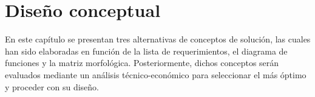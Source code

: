 \chapter{Diseño conceptual}
\label{ch:CH03}
\noindent
En este capítulo se presentan tres alternativas de conceptos de solución, las cuales han sido elaboradas en función de la lista de requerimientos, el diagrama de funciones y la matriz morfológica. Posteriormente, dichos conceptos serán evaluados mediante un análisis técnico-económico para seleccionar el más óptimo y proceder con su diseño.


%
%
%
